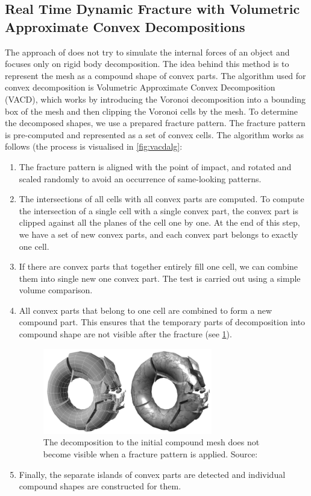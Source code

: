 \subsection{Real Time Dynamic Fracture
with Volumetric Approximate Convex Decompositions}
\label{sec:RTDF}
The approach of \citet{nvidia} does not try to simulate the internal forces of an object and focuses only on rigid body decomposition. The idea behind this method is to represent the mesh as a compound shape of convex parts. The algorithm used for convex decomposition is Volumetric Approximate Convex Decomposition (VACD), which works by introducing the Voronoi decomposition into a bounding box of the mesh and then clipping the Voronoi cells by the mesh. To determine the decomposed shapes, we use a prepared fracture pattern. The fracture pattern is pre-computed and represented as a set of convex cells. The algorithm works as follows (the process is visualised in \cref{fig:vacdalg}:
\begin{enumerate}
\item The fracture pattern is aligned with the point of impact, and rotated and scaled randomly to avoid an occurrence of same-looking patterns.
\item The intersections of all cells with all convex parts are computed. To compute the intersection of a single cell with a single convex part, the convex part is clipped against all the planes of the cell one by one. 
At the end of this step, we have a set of new convex parts, and each convex part belongs to exactly one cell.
\item If there are convex parts that together entirely fill one cell, we can combine them into single new one convex part. The test is carried out using a simple volume comparison.
\item All convex parts that belong to one cell are combined to form a new compound part. This ensures that the temporary parts of decomposition into compound shape are not visible after the fracture (see \cref{fig:vacdfracture}).
\begin{figure}
        \centering
        \includegraphics[width=0.7\textwidth]{img/vacdfracture}
        \caption{The decomposition to the
initial compound mesh does not become visible when a fracture
pattern is applied. Source: \citet{nvidia}}
        \label{fig:vacdfracture}
\end{figure}
\item Finally, the separate islands of convex parts are detected and individual compound shapes are constructed for them.
\end{enumerate}

